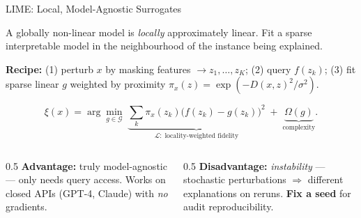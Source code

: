 \documentclass[9pt,t]{beamer}
\begin{document}
\begin{frame}{LIME: Local, Model-Agnostic Surrogates}
\begin{bigpicture}
A globally non-linear model is \emph{locally} approximately linear. Fit a sparse
interpretable model in the neighbourhood of the instance being explained.
\end{bigpicture}

\textbf{Recipe:} (1) perturb $x$ by masking features $\to z_1,\dots,z_K$;
(2) query $f(z_k)$; (3) fit sparse linear $g$ weighted by proximity
$\pi_x(z)=\exp(-D(x,z)^2/\sigma^2)$.

\begin{underhood}
\[
\xi(x) = \arg\min_{g \in \mathcal{G}}\;
\underbrace{\textstyle\sum_k \pi_x(z_k)\bigl(f(z_k)-g(z_k)\bigr)^2}_{\mathcal{L}:\;\text{locality-weighted fidelity}}
\;+\;\underbrace{\Omega(g)}_{\text{complexity}}.
\]
\end{underhood}

\medskip
\begin{columns}[T]
\begin{column}{0.5\textwidth}
\textbf{Advantage:} truly model-agnostic --- only needs query access. Works on
closed APIs (GPT-4, Claude) with \emph{no} gradients.
\end{column}
\begin{column}{0.5\textwidth}
\textbf{Disadvantage:} \emph{instability} --- stochastic perturbations $\Rightarrow$
different explanations on reruns. \textbf{Fix a seed} for audit reproducibility.
\end{column}
\end{columns}
\end{frame}
\end{document}
